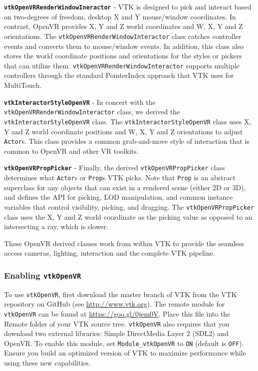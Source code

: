 \textbf{\texttt{vtkOpenVRRenderWindowIneractor}} - VTK is designed to pick and interact based on two-degrees of freedom, desktop X and Y mouse/window coordinates.
In contrast, OpenVR provides X, Y and Z world coordinates and W, X, Y and Z orientations.
The \texttt{vtkOpenVRRenderWindowInteractor} class catches controller events and converts them to mouse/window events.
In addition, this class also stores the world coordinate positions and orientations for the styles or pickers that can utilize them.
\texttt{vtkOpenVRRenderWindowInteractor} supports multiple controllers through the standard PointerIndex approach that VTK uses for MultiTouch.

\textbf{\texttt{vtkInteractorStyleOpenVR}} - In concert with the \texttt{vtkOpenVRRenderWindowInteractor} class, we derived the \texttt{vtkInteractorStyleOpenVR} class.
The \texttt{vtkInteractorStyleOpenVR} class uses X, Y and Z world coordinate positions and W, X, Y and Z orientations to adjust \texttt{Actor}s.
This class provides a common grab-and-move style of interaction that is common to OpenVR and other VR toolkits.

\textbf{\texttt{vtkOpenVRPropPicker}} - Finally, the derived \texttt{vtkOpenVRPropPicker} class determines what \texttt{Actor}s or \texttt{Prop}s VTK picks.
Note that \texttt{Prop} is an abstract superclass for any objects that can exist in a rendered scene (either 2D or 3D), and defines the API for picking, LOD manipulation, and common instance variables that control visibility, picking, and dragging.
The \texttt{vtkOpenVRPropPicker} class uses the X, Y and Z world coordinate as the picking value as opposed to an intersecting a ray, which is slower.

These OpenVR derived classes work from within VTK to provide the seamless access cameras, lighting, interaction and the complete VTK pipeline.

\subsubsection{Enabling \texttt{vtkOpenVR}}

To use \texttt{vtkOpenVR}, first download the master branch of VTK from the VTK
repository on GitHub (see \url{http://www.vtk.org}).
The remote module for \texttt{vtkOpenVR} can be found at
\url{https://goo.gl/0jem0V}. Place this file into the Remote folder of your VTK source tree.
\texttt{vtkOpenVR} also requires that you download two external libraries: Simple DirectMedia Layer 2 (SDL2) and OpenVR.
To enable this module, set \texttt{Module\_vtkOpenVR} to \texttt{ON} (default is \texttt{OFF}).
Ensure you build an optimized version of VTK to maximize performance while using these new capabilities.

